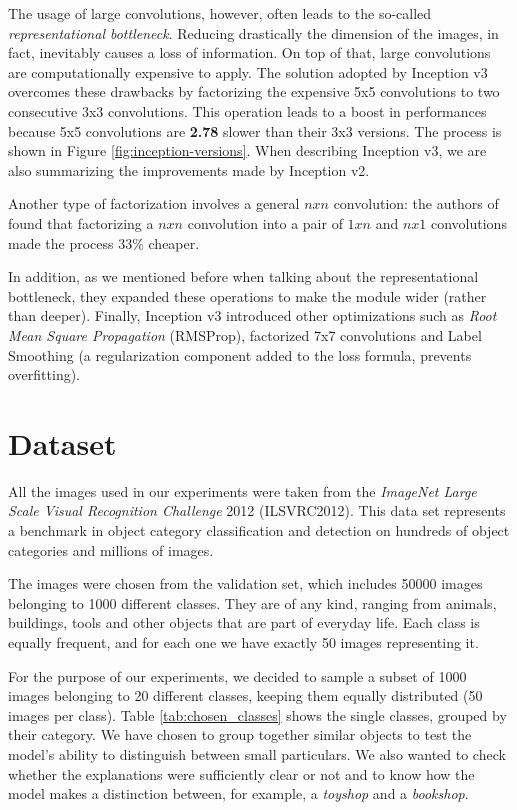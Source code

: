 \documentclass[12pt, twoside, a4paper]{report}
\begin{document}
The usage of large convolutions, however, often leads to the so-called \textit{representational bottleneck}. Reducing drastically the dimension of the images, in fact, inevitably causes a loss of information. On top of that, large convolutions are computationally expensive to apply. The solution adopted by Inception v3 overcomes these drawbacks by factorizing the expensive 5x5 convolutions to two consecutive 3x3 convolutions. This operation leads to a boost in performances because 5x5 convolutions are \textbf{2.78} slower than their 3x3 versions. The process is shown in Figure \ref{fig:inception-versions}. When describing Inception v3, we are also summarizing the improvements made by Inception v2.

Another type of factorization involves a general $nxn$ convolution: the authors of \cite{inception-v3} found that factorizing a $nxn$ convolution into a pair of $1xn$ and $nx1$ convolutions made the process 33\% cheaper. 

In addition, as we mentioned before when talking about the representational bottleneck, they expanded these operations to make the module wider (rather than deeper). 
Finally, Inception v3 introduced other optimizations such as \textit{Root Mean Square Propagation} (RMSProp), factorized 7x7 convolutions and Label Smoothing (a regularization component added to the loss formula, prevents overfitting).

\section{Dataset} \label{sect:dataset_used}

All the images used in our experiments were taken from the \textit{ImageNet Large Scale Visual Recognition Challenge} 2012 (ILSVRC2012)\cite{ilsvrc}. This data set represents a benchmark in object category classification and detection on hundreds of object categories and millions of images. 

The images were chosen from the validation set, which includes 50000 images belonging to 1000 different classes. They are of any kind, ranging from animals, buildings, tools and other objects that are part of everyday life. Each class is equally frequent, and for each one we have exactly 50 images representing it.

For the purpose of our experiments, we decided to sample a subset of 1000 images belonging to 20 different classes, keeping them equally distributed (50 images per class). Table \ref{tab:chosen_classes} shows the single classes, grouped by their category. We have chosen to group together similar objects to test the model's ability to distinguish between small particulars. We also wanted to check whether the explanations were sufficiently clear or not and to know how the model makes a distinction between, for example, a \textit{toyshop} and a \textit{bookshop}.
\end{document}
